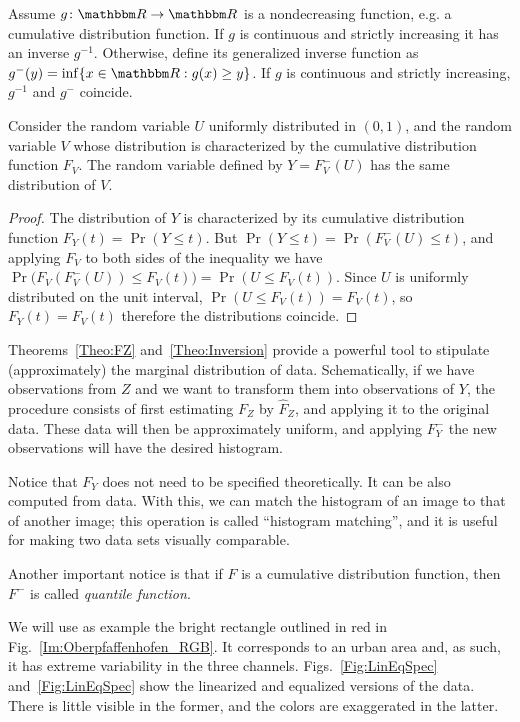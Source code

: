 Assume $g\colon \mathbbm R \to \mathbbm R$ is a nondecreasing function, e.g. a cumulative distribution function.
If $g$ is continuous and strictly increasing it has an inverse $g^{-1}$.
Otherwise, define its generalized inverse function as $g^- (y) = \inf\{ x \in \mathbbm R : g(x)\geq y\}$.
If $g$ is continuous and strictly increasing, $g^{-1}$ and $g^-$ coincide.

\begin{theorem}\label{Theo:Inversion}
Consider the random variable $U$ uniformly distributed in $(0,1)$, and the random variable $V$ whose distribution is characterized by the cumulative distribution function $F_V$.
The random variable defined by $Y=F^-_V(U)$ has the same distribution of $V$.
\end{theorem}

\begin{proof}
The distribution of $Y$ is characterized by its cumulative distribution function $F_Y(t) = \Pr(Y \leq t)$.
But $\Pr(Y \leq t) = \Pr(F^-_V(U) \leq t)$, and applying $F_V$ to both sides of the inequality we have
$ \Pr\big(F_V(F^-_V(U)) \leq F_V(t)\big) = \Pr(U \leq F_V(t))$.
Since $U$ is uniformly distributed on the unit interval, $\Pr(U \leq F_V(t)) = F_V(t)$, so $F_Y(t) = F_V(t)$ therefore the distributions coincide.
\end{proof}

Theorems~\ref{Theo:FZ} and~\ref{Theo:Inversion} provide a powerful tool to stipulate (approximately) the marginal distribution of data.
Schematically, if we have observations from $Z$ and we want to transform them into observations of $Y$, the procedure consists of first estimating $F_Z$ by $\widehat F_Z$, and applying it to the original data.
These data will then be approximately uniform, and applying $F_Y^-$ the new observations will have the desired histogram.

Notice that $F_Y$ does not need to be specified theoretically.
It can be also computed from data.
With this, we can match the histogram of an image to that of another image;
this operation is called ``histogram matching'', and it is useful for making two data sets visually comparable.

Another important notice is that if $F$ is a cumulative distribution function, then $F^-$ is called \textit{quantile function}.

We will use as example the bright rectangle outlined in red in Fig.~\ref{Im:Oberpfaffenhofen_RGB}.
It corresponds to an urban area and, as such, it has extreme variability in the three channels.
Figs.~\ref{Fig:LinEqSpec} and~\ref{Fig:LinEqSpec} show the linearized and equalized versions of the data.
There is little visible in the former, and the colors are exaggerated in the latter.

